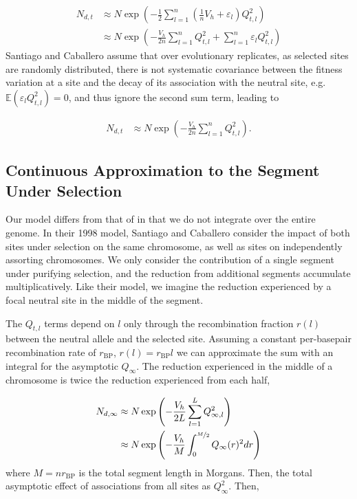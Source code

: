 \documentclass[11pt]{article}
\newcommand{\E}{\mathbb{E}}
\begin{document}
\begin{align}
  N_{d,t} &\approx N \exp\left(- \frac{1}{2}\sum_{l=1}^n \left(\frac{1}{n}V_{h} + \varepsilon_l\right)  Q_{t,l}^2\right) \nonumber \\
          &\approx N \exp\left(- \frac{V_{h}}{2n} \sum_{l=1}^n Q_{t,l}^2+ \sum_{l=1}^n \varepsilon_l  Q_{t,l}^2\right)
\end{align}
%
Santiago and Caballero assume that over evolutionary replicates, as selected
sites are randomly distributed, there is not systematic covariance between the
fitness variation at a site and the decay of its association with the neutral
site, e.g. $\E(\varepsilon_l Q_{t,l}^2) = 0$, and thus ignore the second sum
term, leading to

\begin{align}
      N_{d,t} &\approx N \exp\left(- \frac{V_{h}}{2n} \sum_{l=1}^n Q_{t,l}^2\right).
\end{align}

\subsection{Continuous Approximation to the Segment Under Selection}

Our model differs from that of \textcite{Santiago1998-bs} in that we do not
integrate over the entire genome. In their 1998 model, Santiago and Caballero
consider the impact of both sites under selection on the same chromosome, as
well as sites on independently assorting chromosomes. We only consider the
contribution of a single segment under purifying selection, and the reduction
from additional segments accumulate multiplicatively. Like their model, we
imagine the reduction experienced by a focal neutral site in the middle of the
segment. 

The $Q_{t,l}$ terms depend on $l$ only through the recombination fraction
$r(l)$ between the neutral allele and the selected site. Assuming a constant
per-basepair recombination rate of $r_\text{BP}$, $r(l) = r_\text{BP} l$ we can
approximate the sum with an integral for the asymptotic $Q_\infty$. The
reduction experienced in the middle of a chromosome is twice the reduction
experienced from each half, 

\begin{align}
      N_{d,\infty} &\approx N \exp\left(- \frac{V_{h}}{2L} \sum_{l=1}^L Q_{\infty,l}^2\right) \nonumber \\
              &\approx N \exp\left(- \frac{V_{h}}{M} \int_0^{\nicefrac{M}{2}} Q_{\infty}(r)^2 dr \right) 
\end{align}
%
where $M = n r_\text{BP}$ is the total segment length in Morgans. Then, the
total asymptotic effect of associations from all sites as $Q_\infty^2$.  Then,
\end{document}
